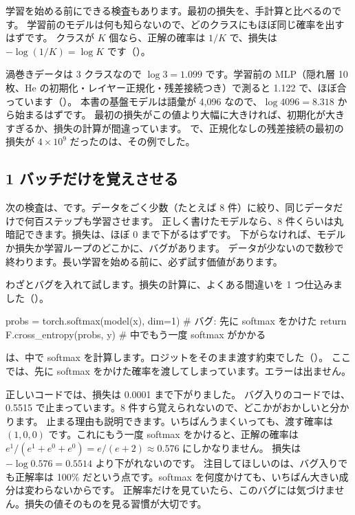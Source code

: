 学習を始める前にできる検査もあります。最初の損失を、手計算と比べるのです。
学習前のモデルは何も知らないので、どのクラスにもほぼ同じ確率を出すはずです。
クラスが $K$ 個なら、正解の確率は $1/K$ で、損失は $-\log(1/K)=\log K$ です（）。

渦巻きデータは 3 クラスなので $\log 3=1.099$ です。学習前の MLP（隠れ層 10 枚、He の初期化・レイヤー正規化・残差接続つき）で測ると 1.122 で、ほぼ合っています（）。
本書の基盤モデルは語彙が 4,096 なので、$\log 4096=8.318$ から始まるはずです。
最初の損失がこの値より大幅に大きければ、初期化が大きすぎるか、損失の計算が間違っています。
で、正規化なしの残差接続の最初の損失が $4\times10^{9}$ だったのは、その例でした。

\subsection*{1 バッチだけを覚えさせる}

次の検査は、です。データをごく少数（たとえば 8 件）に絞り、同じデータだけで何百ステップも学習させます。
正しく書けたモデルなら、8 件くらいは丸暗記できます。損失は、ほぼ 0 まで下がるはずです。
下がらなければ、モデルか損失か学習ループのどこかに、バグがあります。
データが少ないので数秒で終わります。長い学習を始める前に、必ず試す価値があります。

わざとバグを入れて試します。損失の計算に、よくある間違いを 1 つ仕込みました（）。
\begin{pycode}
probs = torch.softmax(model(x), dim=1)   # バグ: 先に softmax をかけた
return F.cross_entropy(probs, y)         # 中でもう一度 softmax がかかる
\end{pycode}
 は、中で softmax を計算します。ロジットをそのまま渡す約束でした（）。
ここでは、先に softmax をかけた確率を渡してしまっています。エラーは出ません。


正しいコードでは、損失は 0.0001 まで下がりました。
バグ入りのコードでは、0.5515 で止まっています。8 件すら覚えられないので、どこかがおかしいと分かります。
止まる理由も説明できます。いちばんうまくいっても、渡す確率は $(1,0,0)$ です。これにもう一度 softmax をかけると、正解の確率は $e^1/(e^1+e^0+e^0)=e/(e+2)\approx0.576$ にしかなりません。
損失は $-\log 0.576=0.5514$ より下がれないのです。
注目してほしいのは、バグ入りでも正解率は 100\% だという点です。softmax を何度かけても、いちばん大きい成分は変わらないからです。
正解率だけを見ていたら、このバグには気づけません。損失の値そのものを見る習慣が大切です。

